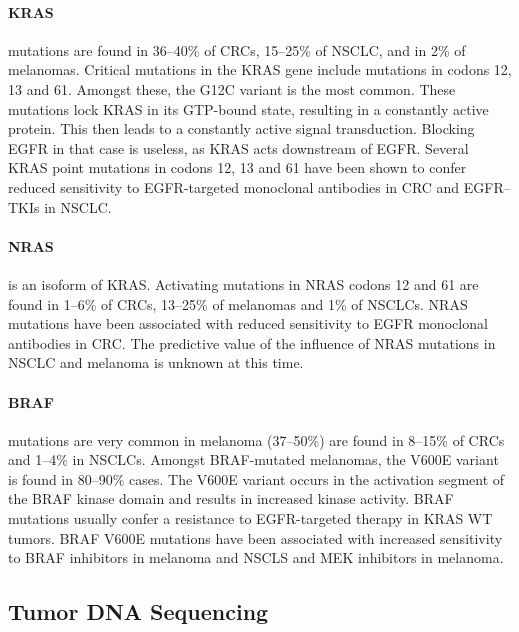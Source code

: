 {{      \paragraph{KRAS} mutations are found in 36--40\% of CRCs, 15--25\% of
      NSCLC, and in 2\% of melanomas. Critical mutations in the KRAS gene
      include mutations in codons 12, 13 and 61. Amongst these, the G12C variant
      is the most common. These mutations lock KRAS in its GTP-bound state,
      resulting in a constantly active protein. This then leads to a constantly
      active signal transduction. Blocking EGFR in that case is useless, as KRAS
      acts downstream of EGFR. Several KRAS point mutations in codons 12, 13 and
      61 have been shown to confer reduced sensitivity to EGFR-targeted
      monoclonal antibodies in CRC and EGFR--TKIs in NSCLC.

      \paragraph{NRAS} is an isoform of KRAS. Activating mutations in NRAS
      codons 12 and 61 are found in 1--6\% of CRCs, 13--25\% of melanomas and
      1\% of NSCLCs. NRAS mutations have been associated with reduced
      sensitivity to EGFR monoclonal antibodies in CRC. The predictive value of
      the influence of NRAS mutations in NSCLC and
      melanoma is unknown at this time.

      \paragraph{BRAF} mutations are very common in melanoma (37--50\%) are
      found in 8--15\% of CRCs and 1--4\% in NSCLCs. Amongst BRAF-mutated
      melanomas, the V600E variant is found in 80--90\% cases. The V600E variant
      occurs in the activation segment of the BRAF kinase domain and results in
      increased kinase activity. BRAF mutations usually confer a resistance to
      EGFR-targeted therapy in KRAS WT tumors. BRAF V600E mutations have been
      associated with increased sensitivity to BRAF inhibitors in melanoma and
      NSCLS and MEK inhibitors in melanoma.

  \subsection{Tumor DNA Sequencing}

}}
